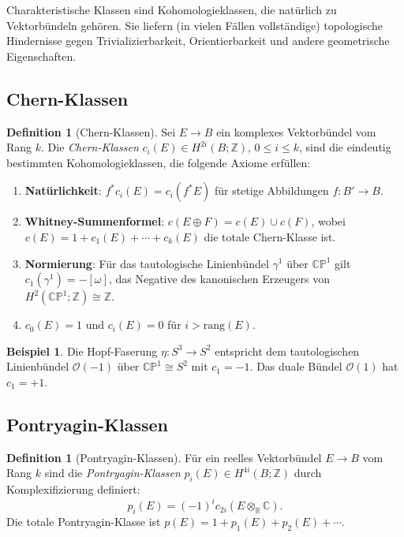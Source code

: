 \documentclass[12pt,a4paper]{amsart}
\theoremstyle{definition}
\newtheorem{definition}[theorem]{Definition}
\newtheorem{example}[theorem]{Beispiel}
\begin{document}
Charakteristische Klassen sind Kohomologieklassen, die natürlich zu Vektorbündeln
gehören. Sie liefern (in vielen Fällen vollständige) topologische Hindernisse
gegen Trivializierbarkeit, Orientierbarkeit und andere geometrische Eigenschaften.

\subsection{Chern-Klassen}

\begin{definition}[Chern-Klassen]
Sei $E \to B$ ein komplexes Vektorbündel vom Rang $k$. Die \emph{Chern-Klassen}
$c_i(E) \in H^{2i}(B; \mathbb{Z})$, $0 \le i \le k$, sind die eindeutig
bestimmten Kohomologieklassen, die folgende Axiome erfüllen:
\begin{enumerate}[noitemsep]
  \item \textbf{Natürlichkeit}: $f^* c_i(E) = c_i(f^*E)$ für stetige
        Abbildungen $f \colon B' \to B$.
  \item \textbf{Whitney-Summenformel}: $c(E \oplus F) = c(E) \cup c(F)$,
        wobei $c(E) = 1 + c_1(E) + \cdots + c_k(E)$ die totale Chern-Klasse ist.
  \item \textbf{Normierung}: Für das tautologische Linienbündel $\gamma^1$ über
        $\mathbb{CP}^1$ gilt $c_1(\gamma^1) = -[\omega]$, das Negative des
        kanonischen Erzeugers von $H^2(\mathbb{CP}^1;\mathbb{Z}) \cong \mathbb{Z}$.
  \item $c_0(E) = 1$ und $c_i(E) = 0$ für $i > \mathrm{rang}(E)$.
\end{enumerate}
\end{definition}

\begin{example}
Die Hopf-Faserung $\eta \colon S^3 \to S^2$ entspricht dem tautologischen
Linienbündel $\mathcal{O}(-1)$ über $\mathbb{CP}^1 \cong S^2$ mit $c_1 = -1$.
Das duale Bündel $\mathcal{O}(1)$ hat $c_1 = +1$.
\end{example}

\subsection{Pontryagin-Klassen}

\begin{definition}[Pontryagin-Klassen]
Für ein reelles Vektorbündel $E \to B$ vom Rang $k$ sind die \emph{Pontryagin-Klassen}
$p_i(E) \in H^{4i}(B; \mathbb{Z})$ durch Komplexifizierung definiert:
\[
  p_i(E) = (-1)^i c_{2i}(E \otimes_\mathbb{R} \mathbb{C}).
\]
Die totale Pontryagin-Klasse ist $p(E) = 1 + p_1(E) + p_2(E) + \cdots$.
\end{definition}
\end{document}
